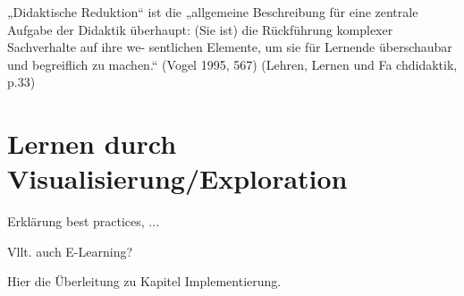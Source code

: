 \hrulefill

„Didaktische  Reduktion“  ist  die  „allgemeine  Beschreibung  für  eine  zentrale  Aufgabe 
der Didaktik überhaupt: (Sie ist) die Rückführung komplexer Sachverhalte auf ihre we-
sentlichen  Elemente,  um  sie  für  Lernende  überschaubar  und  begreiflich  zu  machen.“ 
(Vogel 1995, 567)  
(Lehren, Lernen und Fa chdidaktik, p.33)



\section{Lernen durch Visualisierung/Exploration}

\begin{mdframed}
Erklärung best practices, ...

Vllt. auch E-Learning?

Hier die Überleitung zu Kapitel Implementierung. 
\end{mdframed}